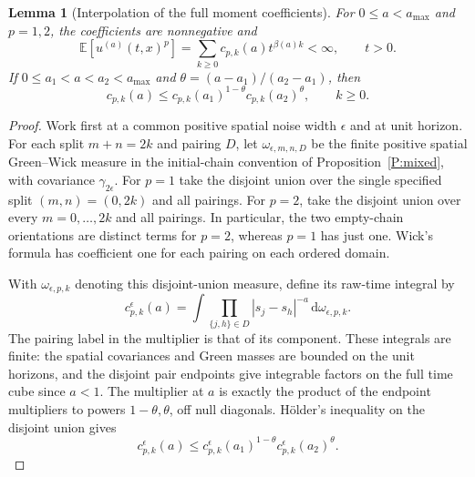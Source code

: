 \documentclass[12pt]{article}
\numberwithin{equation}{section}
\newtheorem{lemma}[theorem]{Lemma}
\theoremstyle{definition}
\newcommand{\E}{\mathbb{E}}
\newcommand{\ud}{\,\mathrm{d}}
\begin{document}
\begin{lemma}[Interpolation of the full moment coefficients]
  \label{L:full-moment-coefficient-holder}
  For \(0\le a<a_{\max}\) and \(p=1,2\), the coefficients are nonnegative and
  \begin{equation}\label{E:full-moment-positive-series}
    \E[u^{(a)}(t,x)^p]
    =\sum_{k\ge0}c_{p,k}(a)t^{\beta(a)k}<\infty,\qquad t>0.
  \end{equation}
  If \(0\le a_1<a<a_2<a_{\max}\) and
  \(\theta=(a-a_1)/(a_2-a_1)\), then
  \begin{equation}\label{E:full-moment-coefficient-holder}
    c_{p,k}(a)\le
    c_{p,k}(a_1)^{1-\theta}c_{p,k}(a_2)^\theta,\qquad k\ge0.
  \end{equation}
\end{lemma}

\begin{proof}
  Work first at a common positive spatial noise width \(\epsilon\) and
  at unit horizon. For each split \(m+n=2k\) and pairing \(D\), let
  \(\omega_{\epsilon,m,n,D}\) be the finite positive spatial
  Green--Wick measure in the initial-chain convention of
  Proposition~\ref{P:mixed}, with covariance \(\gamma_{2\epsilon}\).
  For \(p=1\) take the disjoint union over the single specified split
  \((m,n)=(0,2k)\) and all pairings. For \(p=2\), take the disjoint union
  over every \(m=0,\ldots,2k\) and all pairings. In particular, the two
  empty-chain orientations are distinct terms for \(p=2\), whereas
  \(p=1\) has just one. Wick's formula has coefficient one for each
  pairing on each ordered domain.

  With \(\omega_{\epsilon,p,k}\) denoting this disjoint-union measure,
  define its raw-time integral by
  \[
    c_{p,k}^{\epsilon}(a)=
    \int \prod_{\{j,h\}\in D}|s_j-s_h|^{-a}
    \ud\omega_{\epsilon,p,k}.
  \]
  The pairing label in the multiplier is that of its component.
  These integrals are finite: the spatial covariances and Green masses
  are bounded on the unit horizons, and the disjoint pair endpoints
  give integrable factors on the full time cube since \(a<1\).
  The multiplier at \(a\) is exactly the product of the endpoint
  multipliers to powers \(1-\theta,\theta\), off null diagonals.
  Hölder's inequality on the disjoint union gives
  \[
    c_{p,k}^{\epsilon}(a)\le
    c_{p,k}^{\epsilon}(a_1)^{1-\theta}
    c_{p,k}^{\epsilon}(a_2)^\theta.
  \]


\end{proof}
\end{document}
